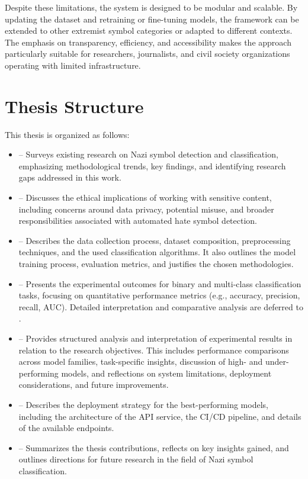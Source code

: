 Despite these limitations, the system is designed to be modular and scalable. By updating the dataset and retraining
or fine-tuning models, the framework can be extended to other extremist symbol categories or adapted to different
contexts. The emphasis on transparency, efficiency, and accessibility makes the approach particularly suitable for
researchers, journalists, and civil society organizations operating with limited infrastructure.

\section{Thesis Structure}

This thesis is organized as follows:

\begin{itemize}
\item \textbf{} – Surveys existing research on Nazi symbol detection and
classification, emphasizing methodological trends, key findings, and identifying research gaps addressed in this work.

\item \textbf{} – Discusses the ethical implications of working with
sensitive content, including concerns around data privacy, potential misuse, and broader responsibilities associated
with automated hate symbol detection.

\item \textbf{} – Describes the data collection process, dataset composition,
preprocessing techniques, and the used classification algorithms. It also outlines the model training process,
evaluation metrics, and justifies the chosen methodologies.

\item \textbf{} – Presents the experimental outcomes for binary and multi-class
classification tasks, focusing on quantitative performance metrics (e.g., accuracy, precision, recall, \ac{AUC}).
Detailed interpretation and comparative analysis are deferred to .

\item \textbf{} – Provides structured analysis and interpretation of
experimental results in relation to the research objectives. This includes performance comparisons across model
families, task-specific insights, discussion of high- and under-performing models, and reflections on
system limitations, deployment considerations, and future improvements.

\item \textbf{} – Describes the deployment strategy for the
best-performing models, including the architecture of the \ac{API} service, the \ac{CI/CD} pipeline, and details of
the available endpoints.

\item \textbf{} – Summarizes the thesis contributions, reflects on key
insights gained, and outlines directions for future research in the field of Nazi symbol classification.
\end{itemize}
